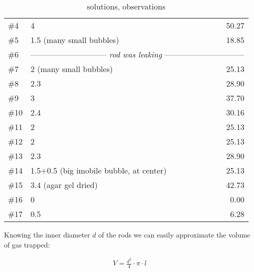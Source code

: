 \begin{table}[]
\begin{tabular}{l|lr}
\#4   & 4					& 50.27				\\
\#5   & 1.5 (many small bubbles)		& 18.85				\\
\#6   & \multicolumn{2}{c}{-----------------------------\textit{ rod was leaking }------------------------------}\\
\#7   & 2 (many small bubbles)			& 25.13				\\
\#8   & 2.3					& 28.90				\\
\#9   & 3					& 37.70				\\
\#10  & 2.4					& 30.16				\\
\#11  & 2					& 25.13				\\
\#12  & 2					& 25.13				\\
\#13  & 2.3					& 28.90				\\
\#14  & 1.5+0.5 (big imobile bubble, at center)	& 25.13				\\
\#15  & 3.4 (agar gel dried)			& 42.73				\\
\#16  & 0					& 0.00				\\
\#17  & 0.5					& 6.28				\\
\bottomrule
\end{tabular}
\caption{solutions, observations}
\label{tab:bubbles}
\end{table}

Knowing the inner diameter $d$ of the rods we can easily approximate the volume of gas trapped:

\begin{align}
 V = \frac{d^2}{4}\cdot \pi \cdot l
\end{align}

